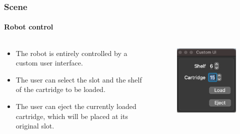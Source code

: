 \documentclass[12pt]{beamer}
\begin{document}
\begin{frame}
\frametitle{Scene}
\framesubtitle{Robot control}
\begin{columns}[T]
\begin{column}{.48\textwidth}
\begin{itemize}
    \item The robot is entirely controlled by a custom user interface.
    \item The user can select the slot and the shelf of the cartridge to be loaded.
    \item The user can eject the currently loaded cartridge, which will be placed at its original slot.
\end{itemize}
\end{column}
\begin{column}{.48\textwidth}
\begin{figure}
    \centering
    \includegraphics[scale=.7]{img/interface.png}
\end{figure}
\end{column}
\end{columns}
\end{frame}
\end{document}
